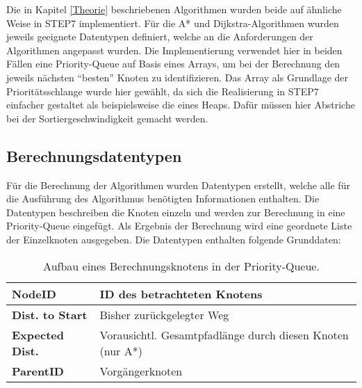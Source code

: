 		Die in Kapitel \ref{Theorie} beschriebenen Algorithmen wurden beide auf ähnliche Weise in \ac{STEP7} implementiert. Für die A* und Dijkstra-Algorithmen wurden jeweils geeignete Datentypen definiert, welche an die Anforderungen der Algorithmen angepasst wurden. Die Implementierung verwendet hier in beiden Fällen eine Priority-Queue auf Basis eines Arrays, um bei der Berechnung den jeweils nächsten "`besten"' Knoten zu identifizieren. Das Array als Grundlage der Prioritätsschlange wurde hier gewählt, da sich die Realisierung in \ac{STEP7} einfacher gestaltet als beispielsweise die eines Heaps. Dafür müssen hier Abstriche bei der Sortiergeschwindigkeit gemacht werden.
		
		\subsection{Berechnungsdatentypen}
			\label{Datentypen_Berechnung}
			Für die Berechnung der Algorithmen wurden Datentypen erstellt, welche alle für die Ausführung des Algorithmus benötigten Informationen enthalten. Die Datentypen beschreiben die Knoten einzeln und werden zur Berechnung in eine Priority-Queue eingefügt. Als Ergebnis der Berechnung wird eine geordnete Liste der Einzelknoten ausgegeben. Die Datentypen enthalten folgende Grunddaten:
			\\
			\begin{table}[H]
				\begin{tabular}{| l | l |}
					\hline
					\textbf{NodeID} & ID des betrachteten Knotens\\ \hline
					\textbf{Dist. to Start} & Bisher zurückgelegter Weg\\ \hline
					\textbf{Expected Dist.} & Vorausichtl. Gesamtpfadlänge durch diesen Knoten (nur A*)\\ \hline
					\textbf{ParentID} & Vorgängerknoten\\
					\hline
				\end{tabular}
				\vspace{0.2cm}
				\caption{Aufbau eines Berechnungsknotens in der Priority-Queue.}
			\end{table}
			
